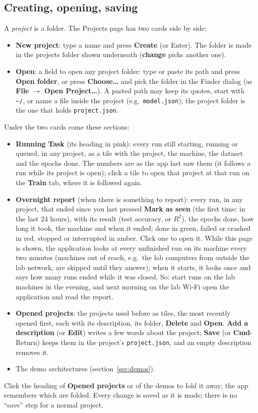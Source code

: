 \documentclass[11pt,a4paper]{article}
\newcommand{\ui}[1]{\textbf{\textsf{#1}}}
\newcommand{\file}[1]{\texttt{#1}}
\begin{document}
\subsection{Creating, opening, saving}
A \emph{project} is a folder. The Projects page has two cards side by side:
\begin{itemize}
  \item \ui{New project}: type a name and press \ui{Create} (or Enter). The folder is made in the projects folder shown underneath
        (\ui{change} picks another one).
  \item \ui{Open}: a field to open any project folder: type or paste its path and press \ui{Open folder}, or press \ui{Choose\ldots} and pick the folder in the Finder dialog (as \ui{File} $\rightarrow$
        \ui{Open Project\ldots}). A pasted path may keep its quotes, start with \texttt{\textasciitilde/}, or name a file inside the project
        (e.g.\ \file{model.json}); the project folder is the one that holds \file{project.json}.
\end{itemize}
Under the two cards come these sections:
\begin{itemize}
  \item \ui{Running Task} (its heading in pink): every run still starting, running or queued, in any project, as a tile with the
        project, the machine, the dataset and the epochs done. The numbers are as the app last saw them (it follows a run while its project
        is open); click a tile to open that project at that run on the \ui{Train} tab, where it is followed again.
  \item \ui{Overnight report} (when there is something to report): every run, in any project, that ended since you last pressed
        \ui{Mark as seen} (the first time: in the last 24 hours), with its result (test accuracy, or $R^2$), the epochs done, how long it
        took, the machine and when it ended; done in green, failed or crashed in red, stopped or interrupted in amber. Click one to open
        it. While this page is shown, the application looks at every unfinished run on its machine every two minutes (machines out of
        reach, e.g.\ the lab computers from outside the lab network, are skipped until they answer); when it starts, it looks once and
        says how many runs ended while it was closed. So: start runs on the lab machines in the evening, and next morning on the lab
        Wi-Fi open the application and read the report.
  \item \ui{Opened projects}: the projects used before as tiles, the most recently opened first, each with its description, its folder,
        \ui{Delete} and \ui{Open}. \ui{Add a description} (or \ui{Edit}) writes a few words about the project; \ui{Save} (or
        \ui{Cmd}-Return) keeps them in the project's \file{project.json}, and an empty description removes it.
  \item The demo architectures (section~\ref{sec:demos}).
\end{itemize}
Click the heading of \ui{Opened projects} or of the demos to fold it away; the app remembers which are folded.
Every change is saved as it is made; there is no ``save'' step for a normal project.
\end{document}
